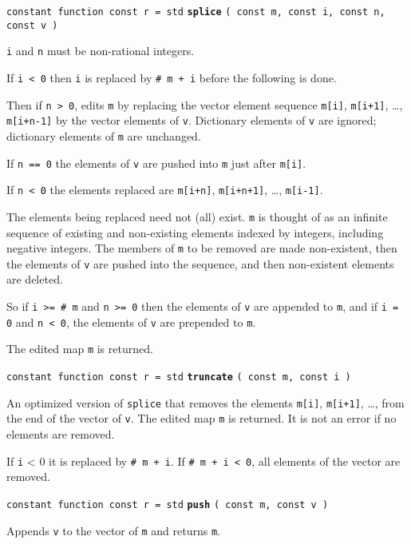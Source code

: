 \documentclass[12pt]{article}
\newcommand{\ttkey}[1]{{\tt \bfseries #1}}
\newenvironment{indpar}[1][0.3in]%
	{\begin{list}{}%
		     {\setlength{\itemsep}{0in}%
		      \setlength{\topsep}{0in}%
		      \setlength{\parsep}{1ex}%
		      \setlength{\labelwidth}{#1}%
		      \setlength{\leftmargin}{#1}%
		      \addtolength{\leftmargin}{\labelsep}}%
	 \item}%
	{\end{list}}
\begin{document}
{\tt constant function const r = std} \ttkey{splice}
    {\tt ( const m, const i, const n, const v )}
\begin{indpar}
{\tt i} and {\tt n} must be non-rational integers.

If {\tt i < 0} then {\tt i} is replaced by {\tt \# m + i} before the
following is done.

Then if {\tt n > 0},
edits {\tt m} by replacing the vector element sequence
{\tt m[i]}, {\tt m[i+1]}, \ldots, {\tt m[i+n-1]} by the
vector elements of {\tt v}.  Dictionary elements of {\tt v} are ignored;
dictionary elements of {\tt m} are unchanged.

If {\tt n == 0}
the elements of {\tt v} are pushed into {\tt m}
just after {\tt m[i]}.

If {\tt n < 0} the elements replaced are
{\tt m[i+n]}, {\tt m[i+n+1]}, \ldots, {\tt m[i-1]}.

The elements being replaced need not (all) exist.  {\tt m} is thought
of as an infinite sequence of existing and non-existing elements indexed
by integers, including negative integers.  The members of
{\tt m} to be removed are made non-existent,
then the elements of {\tt v} are pushed
into the sequence, and then non-existent elements are deleted.

So if {\tt i >= \# m} and {\tt n >= 0} then the elements of {\tt v}
are appended to {\tt m}, and if {\tt i = 0} and {\tt n < 0}, the
elements of {\tt v} are prepended to {\tt m}.

The edited map {\tt m} is returned.

\end{indpar}

{\tt constant function const r = std} \ttkey{truncate}
                                      {\tt ( const m, const i )}
\begin{indpar}
An optimized version of {\tt splice} that removes the elements
{\tt m[i]}, {\tt m[i+1]}, \ldots, from the end of the vector of {\tt v}.
The edited map {\tt m} is returned.  It is not an error if no elements
are removed.

If {\tt i} < 0 it is replaced by {\tt \# m + i}.  If {\tt \# m + i < 0},
all elements of the vector are removed.
\end{indpar}

{\tt constant function const r = std} \ttkey{push} {\tt ( const m, const v )}
\begin{indpar}
Appends {\tt v} to the vector of {\tt m} and returns {\tt m}.
\end{indpar}
\end{document}
